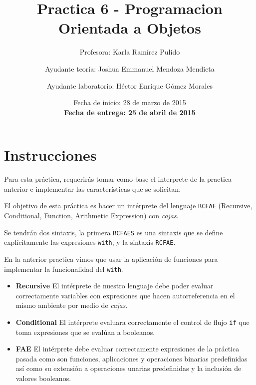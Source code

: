 \documentclass{article}
\author{Profesora: Karla Ramírez Pulido \and
  Ayudante teoría: Joshua Emmanuel Mendoza Mendieta \and
  Ayudante laboratorio: Héctor Enrique Gómez Morales}
\title{Practica 6 - Programacion Orientada a Objetos}
\date{Fecha de inicio: 28 de marzo de 2015\\
  \textbf{Fecha de entrega: 25 de abril de 2015}}
\begin{document}
\maketitle
\section{Instrucciones}

Para esta práctica, requerirás tomar como base el interprete de la practica anterior e implementar las características que se solicitan.

El objetivo de esta práctica es hacer un intérprete del lenguaje \texttt{RCFAE} (Recursive, Conditional, Function, Arithmetic Expression) con \emph{cajas}.

Se tendrán dos sintaxis, la primera \texttt{RCFAES} es una sintaxis que se define explícitamente las expresiones \texttt{with}, y la sintaxis \texttt{RCFAE}.

En la anterior practica vimos que usar la aplicación de funciones para implementar la funcionalidad del \texttt{with}.

\begin{itemize}
\item \textbf{Recursive} El intérprete de nuestro lenguaje debe poder evaluar correctamente variables con expresiones que hacen autorreferencia en el mismo ambiente por medio de \emph{cajas}.
\item \textbf{Conditional} El intérprete evaluara correctamente el control de flujo \texttt{if} que toma expresiones que se evalúan a booleanos.
\item \textbf{FAE} El intérprete debe evaluar correctamente expresiones de la práctica pasada como son funciones, aplicaciones y operaciones binarias predefinidas así como su extensión a operaciones unarias predefinidas y la inclusión de valores booleanos.
\end{itemize}
\end{document}
